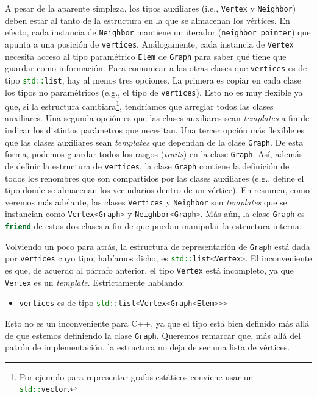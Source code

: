 \documentclass[%
    a4paper,%
    fontsize=12pt,%
    DIV=12,
    twoside,%
    openright,%
    titlepage=true,%
    headsepline,%
    toc=bibliography,%
    parskip=half,%
    cleardoublepage=empty,%
    headings=big,%
]{scrbook}
\makeatletter
\newcommand{\Code}[2][]{\lstinline[basicstyle={\ttfamily},#1]@#2@}
\newcommand{\CPPCode}[2][]{\lstinline[language=C++,basicstyle={\ttfamily},#1]@#2@}
\newcommand{\Graph}{\CPPCode{Graph}\xspace}
\DeclareRobustCommand{\CPP}{C\nolinebreak[4]\hspace{-.05em}\raisebox{.4ex}{\relsize{-3}\textbf{++}}\xspace}
\def\CPP{C++}%
\makeatother
\begin{document}
A pesar de la aparente simpleza, los tipos auxiliares (i.e., \CPPCode{Vertex} y \CPPCode{Neighbor}) deben estar al tanto de la estructura en la que se almacenan los vértices.  En efecto, cada instancia de \CPPCode{Neighbor} mantiene un iterador (\Code{neighbor_pointer}) que apunta a una posición de \CPPCode{vertices}.  Análogamente, cada instancia de \CPPCode{Vertex} necesita acceso al tipo paramétrico \CPPCode{Elem} de \Graph para saber qué tiene que guardar como información.  Para comunicar a las otras clases que \CPPCode{vertices} es de tipo \CPPCode{std::list}, hay al menos tres opciones.  La primera es copiar en cada clase los tipos no paramétricos (e.g., el tipo de \CPPCode{vertices}).  Esto no es muy flexible ya que, si la estructura cambiara\footnote{Por ejemplo para representar grafos estáticos conviene usar un \CPPCode{std::vector}.}, tendríamos que arreglar todos las clases auxiliares.  Una segunda opción es que las clases auxiliares sean \emph{templates} a fin de indicar los distintos parámetros que necesitan.  Una tercer opción más flexible es que las clases auxiliares sean \emph{templates} que dependan de la clase \CPPCode{Graph}.  De esta forma, podemos guardar todos los rasgos (\emph{traits}) en la clase \Graph.  Así, además de definir la estructura de \CPPCode{vertices}, la clase \CPPCode{Graph} contiene la definición de todos los renombres que son compartidos por las clases auxiliares (e.g., define el tipo donde se almacenan los vecindarios dentro de un vértice). En resumen, como veremos más adelante, las clases \CPPCode{Vertices} y \CPPCode{Neighbor} son \emph{templates} que se instancian como \CPPCode{Vertex<Graph>} y \CPPCode{Neighbor<Graph>}.  Más aún, la clase \Graph es \CPPCode{friend} de estas dos clases a fin de que puedan manipular la estructura interna. 

Volviendo un poco para atrás, la estructura de representación de \Graph está dada por \CPPCode{vertices} cuyo tipo, habíamos dicho, es \CPPCode{std::list<Vertex>}.  El inconveniente es que, de acuerdo al párrafo anterior, el tipo \CPPCode{Vertex} está incompleto, ya que \CPPCode{Vertex} es un \emph{template}.  Estrictamente hablando:
\begin{itemize}
  \item \CPPCode{vertices} es de tipo \CPPCode{std::list<Vertex<Graph<Elem>>>}
\end{itemize}
Esto no es un inconveniente para \CPP, ya que el tipo está bien definido más allá de que estemos definiendo la clase \Graph.  Queremos remarcar que, más allá del patrón de implementación, la estructura no deja de ser una lista de vértices.
\end{document}
